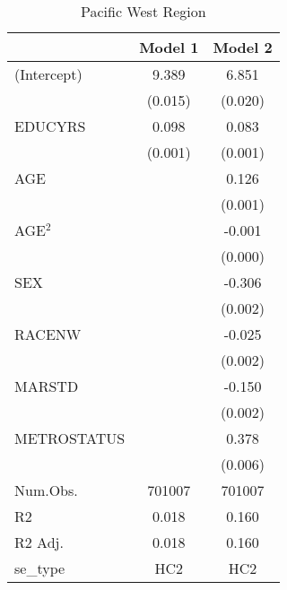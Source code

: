 \documentclass[12pt, English]{article}
\begin{document}
\begin{table}
\centering %
    \caption{Pacific West Region}
    \vspace{7.5mm} %
\begin{tabular}[t]{lcc}
\toprule
  & Model 1 & Model 2\\
\midrule
(Intercept) & 9.389 & 6.851\\
 & (0.015) & (0.020)\\
EDUCYRS & 0.098 & 0.083\\
 & (0.001) & (0.001)\\
AGE &  & 0.126\\
 &  & (0.001)\\
AGE$^2$ &  & -0.001\\
 &  & (0.000)\\
SEX &  & -0.306\\
 &  & \vphantom{2} (0.002)\\
RACENW &  & -0.025\\
 &  & \vphantom{1} (0.002)\\
MARSTD &  & -0.150\\
 &  & (0.002)\\
METROSTATUS &  & 0.378\\
 &  & (0.006)\\
\midrule
Num.Obs. & 701007 & 701007\\
R2 & 0.018 & 0.160\\
R2 Adj. & 0.018 & 0.160\\
se\_type & HC2 & HC2\\
\bottomrule
\end{tabular}
\end{table}

\newpage
\end{document}
